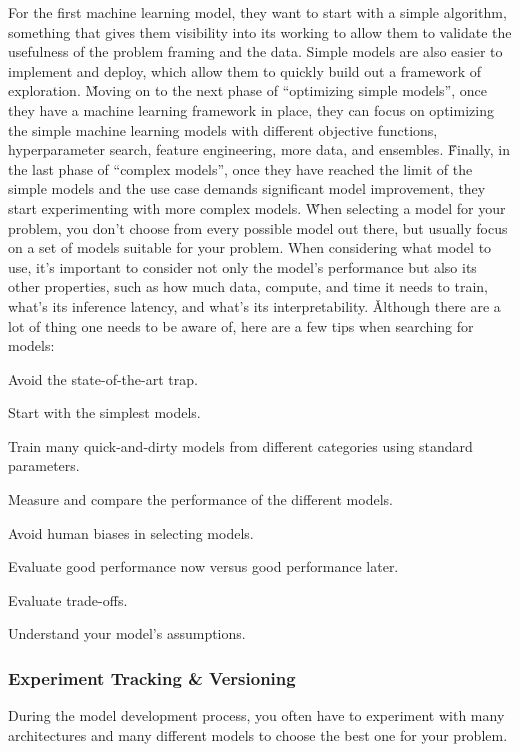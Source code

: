 For the first machine learning model, they want to start with a simple algorithm, something that gives them
visibility into its working to allow them to validate the usefulness of the problem framing and the data. Simple
models are also easier to implement and deploy, which allow them to quickly build out a framework of exploration. \v

Moving on to the next phase of ``optimizing simple models'', once they have a machine learning framework in place,
they can focus on optimizing the simple machine learning models with different objective functions, hyperparameter
search, feature engineering, more data, and ensembles. \v

Finally, in the last phase of ``complex models'', once they have reached the limit of the simple models and the use
case demands significant model improvement, they start experimenting with more complex models. \v

When selecting a model for your problem, you don't choose from every possible model out there, but usually focus on a
set of models suitable for your problem. When considering what model to use, it's important to consider not only the
model's performance but also its other properties, such as how much data, compute, and time it needs to train, what's
its inference latency, and what's its interpretability. \v

Although there are a lot of thing one needs to be aware of, here are a few tips when searching for models:
\bit
\item Avoid the state-of-the-art trap.
\item Start with the simplest models.
\item Train many quick-and-dirty models from different categories using standard parameters.
\item Measure and compare the performance of the different models.
\item Avoid human biases in selecting models.
\item Evaluate good performance now versus good performance later.
\item Evaluate trade-offs.
\item Understand your model's assumptions.
\eit

\subsubsection{Experiment Tracking \& Versioning}

During the model development process, you often have to experiment with many architectures and many different models
to choose the best one for your problem.

